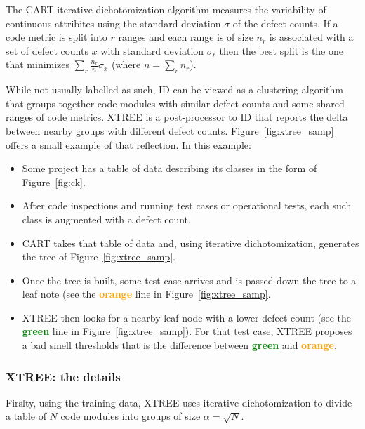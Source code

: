 \documentclass{sig-alternate}
\newcommand{\fig}[1]{Figure~\ref{fig:#1}}
\begin{document}
  The CART iterative dichotomization algorithm
  measures the variability of continuous attribites
  using the  standard deviation $\sigma$ of the defect counts.
  If a code metric is split into $r$ ranges and each range is of
  size
    $n_r$ is
  associated with a set of defect counts $x$ with standard deviation
  $\sigma_r$ then the best split is the one that minimizes
  $\sum_r\frac{n_r}{n}\sigma_x$ (where $n=\sum_r n_r$).
  
  



  While not usually labelled as such, ID can
  be viewed as a clustering algorithm that groups together code modules
  with similar defect counts and some shared ranges of code metrics.
  XTREE is a post-processor to ID that reports the delta between 
  nearby groups with different defect counts. \fig{xtree_samp} offers
  a small example of that reflection. In this example:
  \begin{itemize}
      \item Some project has a table of data describing its  classes in the form of \fig{ck}.
      \item After code inspections and running test cases or operational
      tests, each such class is augmented with a defect count.
      \item CART takes that table of data and, using iterative dichotomization,
        generates the tree of \fig{xtree_samp}.
      \item Once the tree is built, some test case arrives and is passed
      down the tree to a leaf note (see the \textcolor{orange}{{\bf orange}} line in \fig{xtree_samp}.
      \item XTREE then looks for a nearby leaf node with a lower defect
      count (see the \textcolor{green}{{\bf green}} line in \fig{xtree_samp}). For that test case, XTREE proposes a bad smell
      thresholds that is  the difference between 
      \textcolor{green}{{\bf green}} and \textcolor{orange}{{\bf orange}}.
  \end{itemize}
  
  
\subsubsection{XTREE: the details}

Firslty, using the training data,  XTREE uses iterative dichotomization to
  divide a table of $N$ code modules  into  groups of
size $\alpha=\sqrt{N}$.
\end{document}
